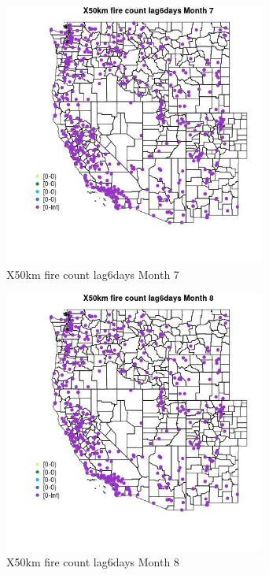\begin{figure} 
\centering  
\includegraphics[width=0.77\textwidth]{Code_Outputs/Report_ML_input_PM25_Step4_part_e_de_duplicated_aves_compiled_2019-05-14wNAs_MapObsMo7X50km_fire_count_lag6days.jpg} 
\caption{\label{fig:Report_ML_input_PM25_Step4_part_e_de_duplicated_aves_compiled_2019-05-14wNAsMapObsMo7X50km_fire_count_lag6days}X50km fire count lag6days Month 7} 
\end{figure} 
 

\begin{figure} 
\centering  
\includegraphics[width=0.77\textwidth]{Code_Outputs/Report_ML_input_PM25_Step4_part_e_de_duplicated_aves_compiled_2019-05-14wNAs_MapObsMo8X50km_fire_count_lag6days.jpg} 
\caption{\label{fig:Report_ML_input_PM25_Step4_part_e_de_duplicated_aves_compiled_2019-05-14wNAsMapObsMo8X50km_fire_count_lag6days}X50km fire count lag6days Month 8} 
\end{figure} 
 

